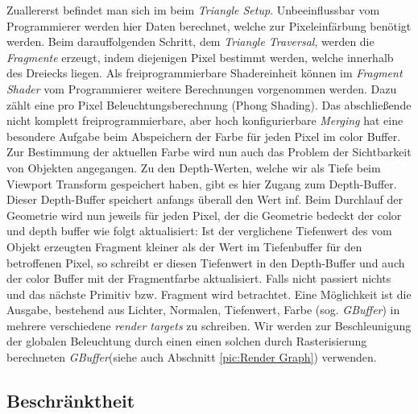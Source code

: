         
Zuallererst befindet man sich im  beim \textit{Triangle Setup}. Unbeeinflussbar vom Programmierer werden hier Daten berechnet, welche zur Pixeleinfärbung
benötigt werden. Beim darauffolgenden Schritt, dem \textit{Triangle Traversal}, werden die \textit{Fragmente} erzeugt, indem diejenigen Pixel bestimmt werden, welche innerhalb des Dreiecks liegen. 
Als freiprogrammierbare Shadereinheit können im \textit{Fragment Shader} vom Programmierer weitere Berechnungen vorgenommen werden. Dazu zählt eine pro Pixel Beleuchtungsberechnung (Phong Shading).
Das abschließende nicht komplett freiprogrammierbare, aber hoch konfigurierbare \textit{Merging} hat eine besondere Aufgabe beim Abspeichern der Farbe für
jeden Pixel im color Buffer. Zur Bestimmung der aktuellen Farbe wird nun auch das Problem der Sichtbarkeit von Objekten angegangen. Zu den Depth-Werten, welche wir als Tiefe beim 
Viewport Transform gespeichert haben, gibt es hier Zugang zum Depth-Buffer. Dieser Depth-Buffer speichert anfangs überall den Wert inf. Beim Durchlauf der Geometrie wird nun jeweils für jeden Pixel,
der die Geometrie bedeckt der color und depth buffer wie folgt aktualisiert: Ist der verglichene Tiefenwert des vom Objekt erzeugten Fragment kleiner als der Wert
im Tiefenbuffer für den betroffenen Pixel, so schreibt er diesen Tiefenwert in den Depth-Buffer und auch der color Buffer mit der Fragmentfarbe aktualisiert.
Falls nicht passiert nichts und das nächste Primitiv bzw. Fragment wird betrachtet. 
Eine Möglichkeit ist die Ausgabe, bestehend aus Lichter, Normalen, Tiefenwert, Farbe (sog. \textit{GBuffer}) in mehrere verschiedene \textit{render targets} zu schreiben. 
Wir werden zur Beschleunigung der globalen Beleuchtung durch einen  einen solchen durch Rasterisierung berechneten \textit{GBuffer}(siehe auch
Abschnitt \ref{pic:Render Graph}) verwenden.
\par

\subsection{Beschränktheit}
\label{sec:Rasterisierung:Beschränktheit}

